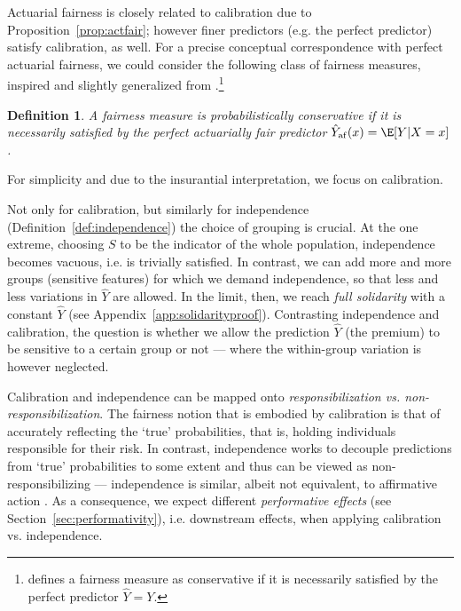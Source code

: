 \documentclass[11pt]{article} %
\makeatletter
\newcommand*{\eg}{e.g.\@\xspace}
\newcommand*{\ie}{i.e.\@\xspace}
\newcommand{\actfairpred}{\hat{Y}_{\mathrm{af}}}
\newtheorem{definition}[theorem]{Definition}
\makeatother
\begin{document}
Actuarial fairness is closely related to calibration due to Proposition~\ref{prop:actfair}; however finer predictors (\eg the perfect predictor) satisfy calibration, as well. For a precise conceptual correspondence with perfect actuarial fairness, we could consider the following class of fairness measures, inspired and slightly generalized from \citet{raz2021group}.\footnote{\citet{raz2021group} defines a fairness measure as conservative if it is necessarily satisfied by the perfect predictor $\hat{Y}=Y$.}
\begin{definition}
    A fairness measure is probabilistically conservative if it is necessarily satisfied by the perfect actuarially fair predictor $\actfairpred(x)=\E[Y|X=x]$.
\end{definition}
For simplicity and due to the insurantial interpretation, we focus on calibration.

Not only for calibration, but similarly for independence (Definition~\ref{def:independence}) the choice of grouping is crucial. At the one extreme, choosing $S$ to be the indicator of the whole population, independence becomes vacuous, \ie is trivially satisfied. In contrast, we can add more and more groups (sensitive features) for which we demand independence, so that less and less variations in $\hat{Y}$ are allowed. In the limit, then, we reach \textit{full solidarity} with a constant $\hat{Y}$ (see Appendix~\ref{app:solidarityproof}).
Contrasting independence and calibration, the question is whether we allow the prediction $\hat{Y}$ (the premium) to be sensitive to a certain group or not --- where the within-group variation is however neglected. 


Calibration and independence can be mapped onto \textit{responsibilization vs. non-responsibilization}. The fairness notion that is embodied by calibration is that of accurately reflecting the `true' probabilities, that is, holding individuals responsible for their risk.
In contrast, independence works to decouple predictions from `true' probabilities to some extent and thus can be viewed as non-responsibilizing --- independence is similar, albeit not equivalent, to affirmative action \citep{raz2021group}. As a consequence, we expect different \textit{performative effects} (see Section~\ref{sec:performativity}), \ie downstream effects, when applying calibration vs. independence. 
\end{document}

